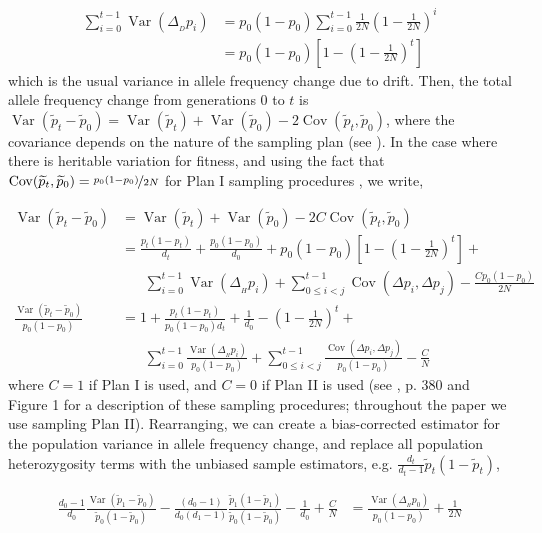 \documentclass[11pt]{article}
\DeclareMathOperator{\var}{Var}
\DeclareMathOperator{\cov}{Cov}
\begin{document}
\begin{align}
  \sum_{i=0}^{t-1} \var(\Delta_{_D} p_i) &= p_0(1-p_0) \sum_{i=0}^{t-1} \frac{1}{2N} \left(1-\frac{1}{2N}\right)^i \\
                                         &= p_0(1-p_0) \left[1 - \left(1-\frac{1}{2N}\right)^t \right]
\end{align}
%
which is the usual variance in allele frequency change due to drift.  Then, the
total allele frequency change from generations $0$ to $t$ is
$\var(\widetilde{p}_t - \widetilde{p}_0) = \var(\widetilde{p}_t) +
\var(\widetilde{p}_0) - 2 \cov(\widetilde{p}_t, \widetilde{p}_0)$, where the
covariance depends on the nature of the sampling plan (see \cite{Nei1981-oy,
Waples1989-sj}). In the case where there is heritable variation for fitness,
and using the fact that $\cov(\widetilde{p}_t, \widetilde{p}_0) =
\nicefrac{p_0(1-p_0)}{2N}$ for Plan I sampling procedures
\parencite{Waples1989-sj}, we write,

\begin{align}
  \var(\widetilde{p}_t - \widetilde{p}_0) &= \var(\widetilde{p}_t) + \var(\widetilde{p}_0) - 2 C \cov(\widetilde{p}_t, \widetilde{p}_0) \\
                                          &= \frac{p_t(1-p_t)}{d_t}  + \frac{p_0(1-p_0)}{d_0} + p_0(1-p_0) \left[1 - \left(1-\frac{1}{2N}\right)^t \right] + \\ & \;\;\;\;\;\;
                                               \sum_{i=0}^{t-1} \var(\Delta_{_H} p_i)  + \sum_{0 \le i < j}^{t-1} \cov(\Delta p_i, \Delta p_j) - \frac{C p_0(1-p_0)}{2N} \\
  \frac{\var(\widetilde{p}_t - \widetilde{p}_0)}{p_0(1-p_0)} &= 1 + \frac{p_t(1-p_t)}{p_0(1-p_0)d_t}  + \frac{1}{d_0} - \left(1-\frac{1}{2N}\right)^t + \\ & \;\;\;\;\;\;
  \sum_{i=0}^{t-1} \frac{\var(\Delta_{_H} p_i)}{p_0(1-p_0)}  + \sum_{0 \le i < j}^{t-1} \frac{\cov(\Delta p_i, \Delta p_j)}{p_0(1-p_0)} - \frac{C}{N}
\end{align}
%
where $C = 1$ if Plan I is used, and $C=0$ if Plan II is used (see
\cite{Waples1989-sj}, p. 380 and Figure 1 for a description of these sampling
procedures; throughout the paper we use sampling Plan II). Rearranging, we can
create a bias-corrected estimator for the population variance in allele
frequency change, and replace all population heterozygosity terms with the
unbiased sample estimators, e.g. $\frac{d_t}{d_t-1} \widetilde{p}_t (1-
\widetilde{p}_t)$,

\begin{align}
  \label{supp:eqn-depth-only-correction}
  \frac{d_0-1}{d_0} \frac{\var(\widetilde{p}_1 - \widetilde{p}_0)}{\widetilde{p}_0(1-\widetilde{p}_0)} - \frac{(d_0-1)}{d_0 (d_1 - 1)} \frac{\widetilde{p}_1(1-\widetilde{p}_1)}{\widetilde{p}_0(1-\widetilde{p}_0)} - \frac{1}{d_0} + \frac{C}{N}  &= \frac{\var(\Delta_{_H} p_0)}{p_0(1-p_0)} + \frac{1}{2N} 
\end{align}
\end{document}

